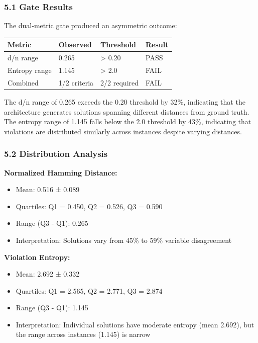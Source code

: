 
\subsubsection{5.1 Gate Results}

The dual-metric gate produced an asymmetric outcome:

\begin{table}[htbp]
\centering
\begin{tabular}{llll}
\toprule
Metric & Observed & Threshold & Result \\
\midrule
d/n range & 0.265 & > 0.20 & PASS \\
Entropy range & 1.145 & > 2.0 & FAIL \\
Combined & 1/2 criteria & 2/2 required & FAIL \\
\bottomrule
\end{tabular}
\end{table}

The d/n range of 0.265 exceeds the 0.20 threshold by 32\%, indicating that the architecture generates solutions spanning different distances from ground truth. The entropy range of 1.145 falls below the 2.0 threshold by 43\%, indicating that violations are distributed similarly across instances despite varying distances.

\subsubsection{5.2 Distribution Analysis}

\textbf{Normalized Hamming Distance:}
\begin{itemize}
\item Mean: 0.516 ± 0.089
\item Quartiles: Q1 = 0.450, Q2 = 0.526, Q3 = 0.590
\item Range (Q3 - Q1): 0.265
\item Interpretation: Solutions vary from 45\% to 59\% variable disagreement
\end{itemize}

\textbf{Violation Entropy:}
\begin{itemize}
\item Mean: 2.692 ± 0.332
\item Quartiles: Q1 = 2.565, Q2 = 2.771, Q3 = 2.874
\item Range (Q3 - Q1): 1.145
\item Interpretation: Individual solutions have moderate entropy (mean 2.692), but the range across instances (1.145) is narrow
\end{itemize}


